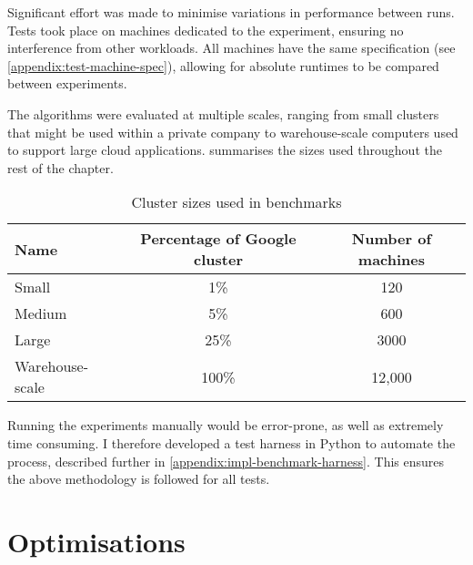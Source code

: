 
Significant effort was made to minimise variations in performance between runs. Tests took place on machines dedicated to the experiment, ensuring no interference from other workloads. All machines have the same specification (see \cref{appendix:test-machine-spec}), allowing for absolute runtimes to be compared between experiments.

The algorithms were evaluated at multiple scales, ranging from small clusters that might be used within a private company to warehouse-scale computers used to support large cloud applications.  summarises the sizes used throughout the rest of the chapter.

\begin{table}
    \centering
    \begin{tabular}{lcc}
        \textbf{Name} & \textbf{Percentage of Google cluster} & \textbf{Number of machines} \tabularnewline
        \hline
        Small & 1\% & 120 \tabularnewline
        Medium & 5\% & 600 \tabularnewline
        Large & 25\% & 3000 \tabularnewline 
        Warehouse-scale & 100\% & 12,000 \tabularnewline
    \end{tabular}
    \caption{Cluster sizes used in benchmarks}
    \label{table:cluster-sizes}
\end{table}

Running the experiments manually would be error-prone, as well as extremely time consuming. I therefore developed a test harness in Python to automate the process, described further in \cref{appendix:impl-benchmark-harness}. This ensures the above methodology is followed for all tests.



\section{Optimisations} \label{sec:eval-optimisations}

